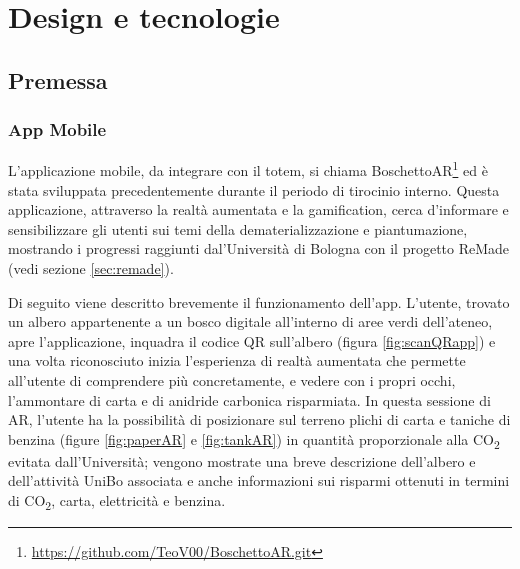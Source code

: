 \chapter{Design e tecnologie}
\section{Premessa}
\subsection{App Mobile}
L'applicazione mobile, da integrare con il totem, si chiama BoschettoAR\footnote{\url{https://github.com/TeoV00/BoschettoAR.git}} ed è stata sviluppata precedentemente durante il periodo di tirocinio interno. Questa applicazione, attraverso la realtà aumentata e la gamification, cerca d'informare e sensibilizzare gli utenti sui temi della dematerializzazione e piantumazione, mostrando i progressi raggiunti dal'Università di Bologna con il progetto ReMade (vedi sezione \ref{sec:remade}).

Di seguito viene descritto brevemente il funzionamento dell'app.
L'utente, trovato un albero appartenente a un bosco digitale all'interno di aree verdi dell'ateneo, apre l'applicazione, inquadra il codice QR sull'albero (figura \ref{fig:scanQRapp}) e una volta riconosciuto inizia l'esperienza di realtà aumentata che permette all'utente di comprendere più concretamente, e vedere con i propri occhi, l'ammontare di carta e di anidride carbonica risparmiata. In questa sessione di AR, l'utente ha la possibilità di posizionare sul terreno plichi di carta e taniche di benzina (figure \ref{fig:paperAR} e \ref{fig:tankAR}) in quantità proporzionale alla CO\textsubscript{2} evitata dall'Università; vengono mostrate una breve descrizione dell'albero e dell'attività UniBo associata e anche informazioni sui risparmi ottenuti in termini di CO\textsubscript{2}, carta, elettricità e benzina.

